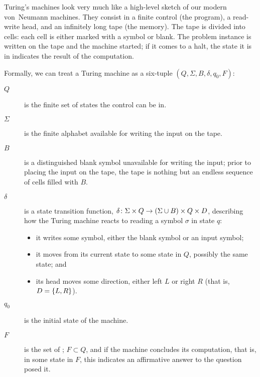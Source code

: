 Turing's machines look very much like a high-level sketch of our modern von~Neumann machines. They consist in a finite control (the program), a read-write head, and an infinitely long tape (the memory). The tape is divided into cells: each cell is either marked with a symbol or blank. The problem instance is written on the tape and the machine started; if it comes to a halt, the state it is in indicates the result of the computation.

Formally, we can treat a Turing machine as a six-tuple $(Q, \Sigma, B, \delta, q_{0}, F)$:
\begin{description} %
\item[\MakeUppercase{$Q$}] is the finite set of states the control can be in.
\item[$\Sigma$] is the finite alphabet available for writing the input on the tape.
\item[\MakeUppercase{$B$}] is a distinguished blank symbol unavailable for writing the input; prior to placing the input on the tape, the tape is nothing but an endless sequence of cells filled with $B$.
\item[$\delta$] is a state transition function, $\delta\colon \Sigma \times Q \to (\Sigma \cup B) \times Q \times D$, describing how the Turing machine reacts to reading a symbol $\sigma$ in state $q$: 
\begin{itemize}
\item it writes some symbol, either the blank symbol or an input symbol; 
\item it moves from its current state to some state in $Q$, possibly the same state; and
\item its head moves some direction, either left $L$ or right $R$ (that is, $D = \left\{ L, R \right\}$).
\end{itemize}
\item[$q_{0}$] is the initial state of the machine.
\item[\MakeUppercase{$F$}] is the set of ; $F \subset Q$, and if the machine concludes its computation, that is,  in some state in $F$, this indicates an affirmative answer to the question posed it.
\end{description}

